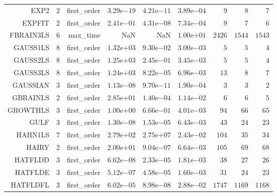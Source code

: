 \begin{longtable}{rrrrrrrrr}
EXP2 & \(     2\) & first\_order & \( 3.29\)e\(-19\) & \( 4.21\)e\(-11\) & \( 3.89\)e\(-04\) & \(     9\) & \(     8\) & \(     7\) \\
EXPFIT & \(     2\) & first\_order & \( 2.41\)e\(-01\) & \( 4.31\)e\(-08\) & \( 7.34\)e\(-04\) & \(     9\) & \(     7\) & \(     6\) \\
FBRAIN3LS & \(     6\) & max\_time &       NaN &       NaN & \( 1.00\)e\(+01\) & \(  2426\) & \(  1544\) & \(  1543\) \\
GAUSS1LS & \(     8\) & first\_order & \( 1.32\)e\(+03\) & \( 9.30\)e\(-02\) & \( 3.00\)e\(-03\) & \(     5\) & \(     5\) & \(     4\) \\
GAUSS2LS & \(     8\) & first\_order & \( 1.25\)e\(+03\) & \( 2.45\)e\(-01\) & \( 3.45\)e\(-03\) & \(     5\) & \(     5\) & \(     4\) \\
GAUSS3LS & \(     8\) & first\_order & \( 1.24\)e\(+03\) & \( 8.22\)e\(-05\) & \( 6.96\)e\(-03\) & \(    13\) & \(     8\) & \(     7\) \\
GAUSSIAN & \(     3\) & first\_order & \( 1.13\)e\(-08\) & \( 9.70\)e\(-11\) & \( 1.90\)e\(-04\) & \(     3\) & \(     3\) & \(     2\) \\
GBRAINLS & \(     2\) & first\_order & \( 2.85\)e\(+01\) & \( 1.40\)e\(-04\) & \( 1.14\)e\(-02\) & \(     6\) & \(     6\) & \(     5\) \\
GROWTHLS & \(     3\) & first\_order & \( 1.00\)e\(+00\) & \( 6.66\)e\(-01\) & \( 4.01\)e\(-03\) & \(    94\) & \(    66\) & \(    65\) \\
GULF & \(     3\) & first\_order & \( 1.30\)e\(-08\) & \( 1.53\)e\(-05\) & \( 6.43\)e\(-03\) & \(    43\) & \(    24\) & \(    23\) \\
HAHN1LS & \(     7\) & first\_order & \( 2.79\)e\(+02\) & \( 2.75\)e\(+07\) & \( 2.43\)e\(-02\) & \(   104\) & \(    35\) & \(    34\) \\
HAIRY & \(     2\) & first\_order & \( 2.00\)e\(+01\) & \( 9.04\)e\(-07\) & \( 6.64\)e\(-03\) & \(   105\) & \(    69\) & \(    68\) \\
HATFLDD & \(     3\) & first\_order & \( 6.62\)e\(-08\) & \( 2.33\)e\(-05\) & \( 1.81\)e\(-03\) & \(    38\) & \(    27\) & \(    26\) \\
HATFLDE & \(     3\) & first\_order & \( 5.12\)e\(-07\) & \( 4.58\)e\(-05\) & \( 1.60\)e\(-03\) & \(    31\) & \(    24\) & \(    23\) \\
HATFLDFL & \(     3\) & first\_order & \( 6.02\)e\(-05\) & \( 8.98\)e\(-08\) & \( 2.88\)e\(-02\) & \(  1747\) & \(  1169\) & \(  1168\) \\

\end{longtable}
